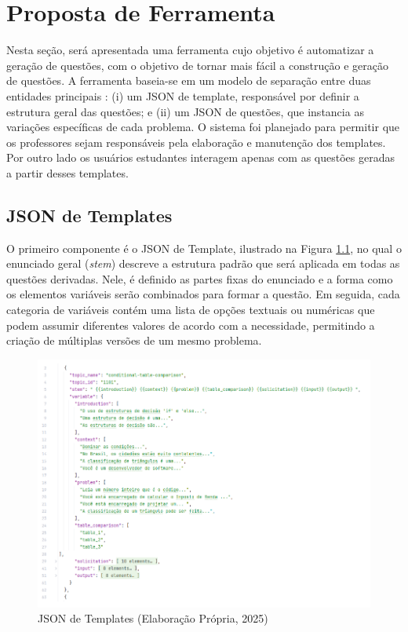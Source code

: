 \chapter{Proposta de Ferramenta}

Nesta seção, será apresentada uma ferramenta cujo objetivo é automatizar a geração de questões, com o objetivo de tornar mais fácil a construção e geração de questões. A ferramenta baseia-se em um modelo de separação entre duas entidades principais : (i) um JSON de template, responsável por definir a estrutura geral das questões; e (ii) um JSON de questões, que instancia as variações específicas de cada problema. O sistema foi planejado para permitir que os professores sejam responsáveis pela elaboração e manutenção dos templates. Por outro lado os usuários estudantes interagem apenas com as questões geradas a partir desses templates.

\section{JSON de Templates}

O primeiro componente é o JSON de Template, ilustrado na Figura \ref{fig:json-de-templates}, no qual o enunciado geral (\textit{stem}) descreve a estrutura padrão que será aplicada em todas as questões derivadas. Nele, é definido as partes fixas do enunciado e a forma como os elementos variáveis serão combinados para formar a questão. Em seguida, cada categoria de variáveis contém uma lista de opções textuais ou numéricas que podem assumir diferentes valores de acordo com a necessidade, permitindo a criação de múltiplas versões de um mesmo problema.


\begin{figure}[ht]
	\centering
	\includegraphics[width=16cm]{./imagens/capitulo7/json-de-template}
	\caption{JSON de Templates (Elaboração Própria, 2025) }
	\label{fig:json-de-templates}
\end{figure}
